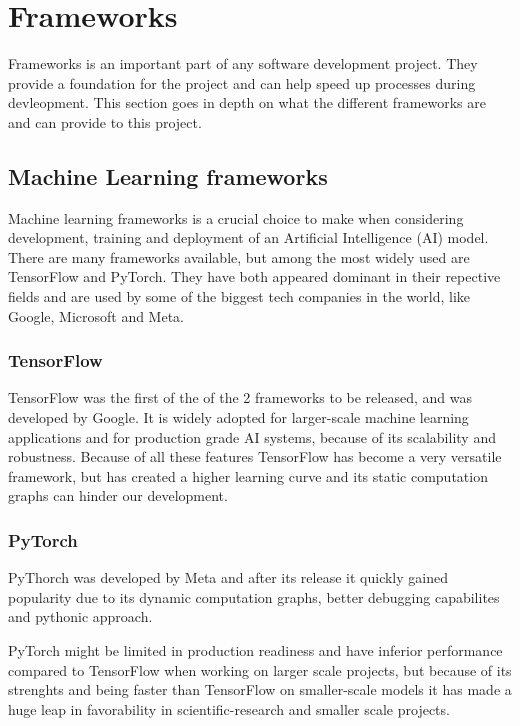 \section{Frameworks}
\label{sec:Frameworks}

Frameworks is an important part of any software development project. 
They provide a foundation for the project and can help speed up processes 
during devleopment. This section goes in depth on what the different frameworks 
are and can provide to this project.

\subsection{Machine Learning frameworks}

Machine learning frameworks is a crucial choice to make when considering development,
training and deployment of an Artificial Intelligence (AI) model. 
There are many frameworks available, but among the most widely used are TensorFlow
and PyTorch. They have both appeared dominant in their repective fields and are used
by some of the biggest tech companies in the world, like Google, Microsoft and Meta.\cite{PyTorchVsTensorFlow}

\subsubsection{TensorFlow}
TensorFlow was the first of the of the 2 frameworks to be released, 
and was developed by Google. \cite{TensorFlow} It is widely adopted for 
larger-scale machine learning applications and for production grade AI systems, 
because of its scalability and robustness. \cite{simplilearn}
Because of all these features TensorFlow has become a very versatile framework, 
but has created a higher learning curve and its static computation graphs can hinder our development. 


\subsubsection{PyTorch}
PyThorch was developed by Meta and after its release it quickly gained popularity due to its dynamic 
computation graphs, better debugging capabilites and pythonic approach. \cite{PyTorch}

PyTorch might be limited in production readiness and have inferior performance compared to 
TensorFlow when working on larger scale projects, but because of its strenghts and being faster 
than TensorFlow on smaller-scale models it has made a huge leap in favorability in 
scientific-research and smaller scale projects. \cite{simplilearn}

